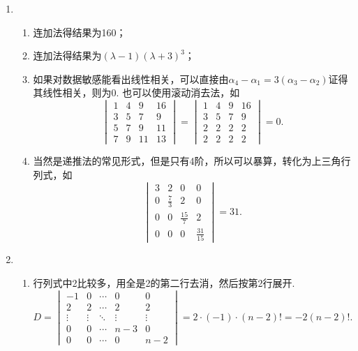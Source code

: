 \begin{enumerate}
    \item \begin{enumerate}
              \item 连加法得结果为160；

              \item 连加法得结果为$(\lambda-1)(\lambda+3)^3$；

              \item 如果对数据敏感能看出线性相关，可以直接由$\alpha_4-\alpha_1=3(\alpha_3-\alpha_2)$证得其线性相关，则为0. 也可以使用滚动消去法，如\[
                        \begin{vmatrix}
                            1 & 4 & 9  & 16 \\
                            3 & 5 & 7  & 9  \\
                            5 & 7 & 9  & 11 \\
                            7 & 9 & 11 & 13
                        \end{vmatrix}=\begin{vmatrix}
                            1 & 4 & 9 & 16 \\
                            3 & 5 & 7 & 9  \\
                            2 & 2 & 2 & 2  \\
                            2 & 2 & 2 & 2
                        \end{vmatrix}=0.\]

              \item 当然是递推法的常见形式，但是只有4阶，所以可以暴算，转化为上三角行列式，如\[
                        \begin{vmatrix}
                            3 & 2           & 0            & 0             \\
                            0 & \frac{7}{3} & 2            & 0             \\
                            0 & 0           & \frac{15}{7} & 2             \\
                            0 & 0           & 0            & \frac{31}{15}
                        \end{vmatrix}=31.\]
          \end{enumerate}

    \item \begin{enumerate}
              \item 行列式中2比较多，用全是2的第二行去消，然后按第2行展开.
                    \[D=\begin{vmatrix}
                            -1     & 0      & \cdots & 0      & 0      \\
                            2      & 2      & \cdots & 2      & 2      \\
                            \vdots & \vdots & \ddots & \vdots & \vdots \\
                            0      & 0      & \cdots & n-3    & 0      \\
                            0      & 0      & \cdots & 0      & n-2
                        \end{vmatrix}=2\cdot(-1)\cdot(n-2)!=-2(n-2)!.\]


\end{enumerate}
\end{enumerate}
